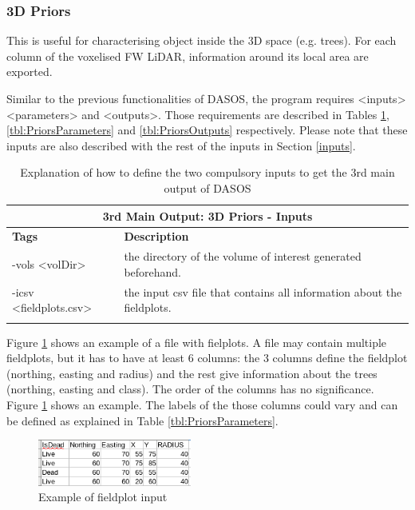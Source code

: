 \documentclass{article}
\begin{document}
	 	\newpage
		\subsubsection{3D Priors}\label{3Dpriors}
		\par This is useful for characterising object inside the 3D space (e.g. trees). For each column of the voxelised FW LiDAR, information around its local area are exported. 
		
		
		\par Similar to the previous functionalities of DASOS, the program requires <inputs> <parameters> and <outputs>. Those requirements are described in Tables \ref{tbl:PriorsInputs}, \ref{tbl:PriorsParameters} and \ref{tbl:PriorsOutputs} respectively. Please note that these inputs are also described with the rest of the inputs in Section \ref{inputs}.
		
		
		\begin{longtable}
		 	{|p{3.1cm}|p{11cm}|}
						
			\toprule
			\multicolumn{2}{|c|}{\textbf{3rd Main Output: 3D Priors - Inputs }} \\
			\midrule
		
			\textbf{Tags} & \textbf{Description} \\ 
			\cmidrule(r){1-1}\cmidrule(l){2-2}
			 -vols <volDir>  &  the directory of the volume of interest generated beforehand. 
			 \\
			\cmidrule(r){1-1}\cmidrule(l){2-2}
			 -icsv \newline <fieldplots.csv> & the input csv file that contains all information about the fieldplots. 
			    \\
			\bottomrule
			\caption[DASOS's functionalities]{Explanation of how to define the two compulsory inputs to get the 3rd main output of DASOS}
			\label{tbl:PriorsInputs}	
		\end{longtable}
		
		\par Figure \ref{fig:fieldplot} shows an example of a file with fielplots. A file may contain multiple fieldplots, but it has to have at least 6 columns: the 3 columns define the fieldplot (northing, easting and radius) and the rest give information about the trees (northing, easting and class). The order of the columns has no significance. Figure \ref{fig:fieldplot} shows an example. The labels of the those columns could vary and can be defined as explained in Table \ref{tbl:PriorsParameters}. 
		
		  \begin{figure} [h!]
		  	\centering
		  	\includegraphics[width=0.45\textwidth]{img/fieldplot}
		  	\caption{Example of fieldplot input}
		  	\label{fig:fieldplot}
		  \end{figure}	
		
\end{document}
